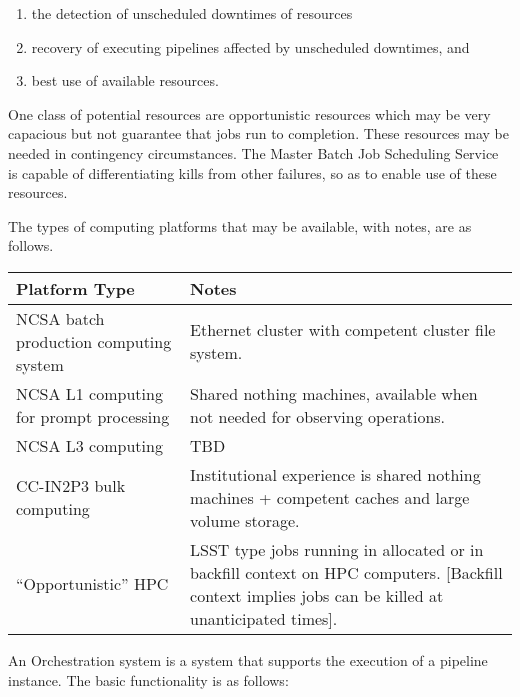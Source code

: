 \begin{enumerate}

\item the detection of unscheduled downtimes of resources

\item recovery of executing pipelines affected by unscheduled downtimes, and 

\item best use of available resources. 

\end{enumerate}

One class of potential resources  are opportunistic resources which may be very 
capacious but not guarantee that jobs run to completion. These resources may be 
needed in contingency circumstances. The Master Batch Job Scheduling Service is 
capable of differentiating kills from other failures, so as to enable use of 
these resources. 

The types of computing platforms that may be available, with notes, are as 
follows.

\begin{longtable}{|p{}|p{}|}\hline
\textbf{Platform Type} & \textbf{Notes} \\\hline
NCSA batch production computing system & Ethernet cluster with competent cluster 
file system. \\\hline
NCSA L1 computing for prompt processing & Shared nothing machines, available 
when not needed for observing operations. \\\hline
NCSA L3 computing & TBD \\\hline
CC-IN2P3 bulk computing & Institutional experience is shared nothing machines + 
competent caches 
and large volume storage. \\\hline
``Opportunistic'' HPC & LSST type jobs  running in allocated or in  backfill 
context on HPC computers. [Backfill context implies jobs can be killed at 
unanticipated times]. \\\hline
\end{longtable}

An Orchestration system is a system that supports the execution of a pipeline 
instance. The basic functionality is as follows:

